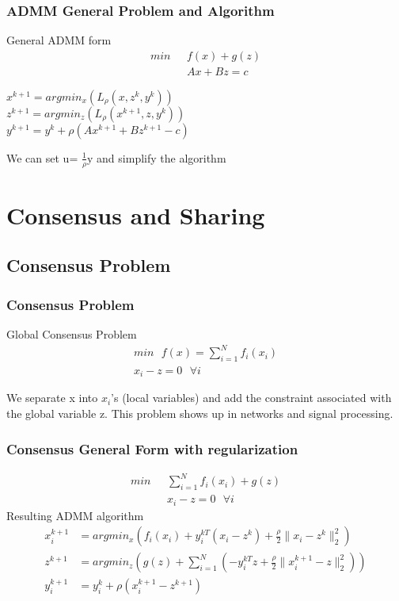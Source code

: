 \documentclass{beamer}
\begin{document}
\begin{frame}
\frametitle{ADMM General Problem and Algorithm}
General ADMM form
\begin{align}
  min \: \: \: &f(x) + g(z) \\
  & Ax + Bz = c
\end{align}
\begin{theorem}
  $x^{k+1} = argmin_{x} \left( L_{\rho} (x,z^{k}, y^{k} ) \right)$ \\
  $z^{k+1} = argmin_{z} \left( L_{\rho}(x^{k+1},z,y^{k} )\right)$ \\
  $y^{k+1} = y^{k} + \rho(Ax^{k+1} + Bz^{k+1} - c)  $
\end{theorem}
We can set u= $\frac{1}{\rho}$y and simplify the algorithm
\end{frame}


\section{Consensus and Sharing}
\subsection{Consensus Problem}
\begin{frame}
  \frametitle{Consensus Problem}
  Global Consensus Problem
  \begin{align}
    min \: \: \: f(x)=\sum_{i=1}^{N} f_{i}(x_{i}) \\
    x_{i} - z = 0 \: \: \: \forall i
  \end{align}

  We separate x into $x_{i}$'s (local variables) and add the constraint associated with the global variable z.
  \linebreak
  \newline
  This problem shows up in networks and signal processing.
\end{frame}

\begin{frame}
  \frametitle{Consensus General Form with regularization} 
  \begin{align}
    min \: \: \: &\sum_{i=1}^{N} f_{i}(x_{i}) + g(z) \\
    &x_{i} - z = 0 \: \: \: \forall i
  \end{align}
  Resulting ADMM algorithm
  \begin{align}
    x_{i}^{k+1} &= argmin_{x} \left(f_{i}(x_{i}) + y_{i}^{kT}(x_{i} - z^{k}) + \frac{\rho}{2} \|x_{i} - z^{k} \|_{2}^{2}    \right) \\
    z^{k+1} &= argmin_{z} \left( g(z) + \sum_{i=1}^{N} \left( -y_{i}^{kT}z + \frac{\rho}{2} \|x_{i}^{k+1}-z\|_{2}^{2}  \right)  \right) \\
    y_{i}^{k+1} &= y_{i}^{k} + \rho (x_{i}^{k+1} - z^{k+1})
  \end{align}
\end{frame}
\end{document}
